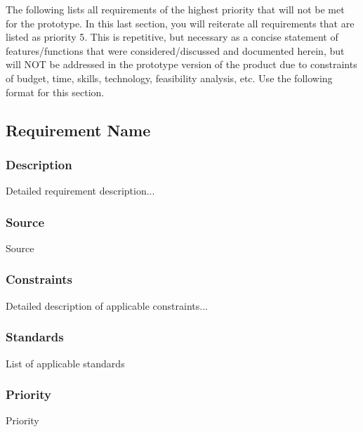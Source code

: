 The following lists all requirements of the highest priority that will not be met for the prototype. 
In this last section, you will reiterate all requirements that are listed as priority 5. This is repetitive, but necessary as a concise statement of features/functions that were considered/discussed and documented herein, but will NOT be addressed in the prototype version of the product due to constraints of budget, time, skills, technology, feasibility analysis, etc. Use the following format for this section.

\subsection{Requirement Name}
\subsubsection{Description}
Detailed requirement description...
\subsubsection{Source}
Source
\subsubsection{Constraints}
Detailed description of applicable constraints...
\subsubsection{Standards}
List of applicable standards
\subsubsection{Priority}
Priority
